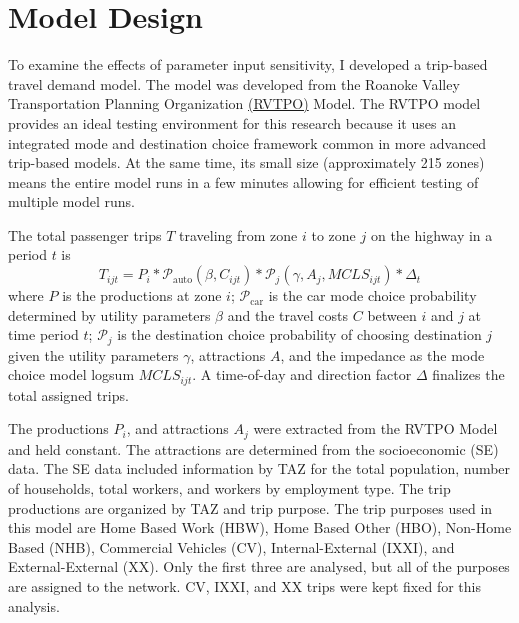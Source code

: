 \documentclass[fancy, masters, twoside]{byuthesis}
\begin{document}
\hypertarget{model-design}{%
\section{Model Design}\label{model-design}}

To examine the effects of parameter input sensitivity, I developed a trip-based travel demand model. The model was developed from the Roanoke Valley Transportation Planning Organization \href{https://github.com/xinwangvdot/rvtpo}{(RVTPO)} Model. The RVTPO model provides an ideal testing environment for this research because it uses an integrated mode and destination choice framework common in more advanced trip-based models. At the same time, its small size (approximately 215 zones) means the entire model runs in a few minutes allowing for efficient testing of multiple model runs.

The total passenger trips \(T\) traveling from zone \(i\) to zone \(j\) on the highway in a period \(t\) is
\begin{equation}
T_{ijt} = P_i * \mathcal{P}_{\mathrm{auto}}(\beta, C_{ijt}) * \mathcal{P}_j(\gamma, A_j, MCLS_{ijt}) * \Delta_t
\label{eq:trips}
\end{equation}
where \(P\) is the productions at zone \(i\); \(\mathcal{P}_{\mathrm{car}}\) is the car mode choice probability determined by utility parameters \(\beta\) and the travel costs \(C\) between \(i\) and \(j\) at time period \(t\); \(\mathcal{P}_{j}\) is the destination choice probability of choosing destination \(j\) given the utility parameters \(\gamma\), attractions \(A\), and the impedance as the mode choice model logsum \(MCLS_{ijt}\). A time-of-day and direction factor \(\Delta\) finalizes the total assigned trips.

The productions \(P_i\), and attractions \(A_j\) were extracted from the RVTPO Model and held constant. The attractions are determined from the socioeconomic (SE) data. The SE data included information by TAZ for the total population, number of households, total workers, and workers by employment type. The trip productions are organized by TAZ and trip purpose. The trip purposes used in this model are Home Based Work (HBW), Home Based Other (HBO), Non-Home Based (NHB), Commercial Vehicles (CV), Internal-External (IXXI), and External-External (XX). Only the first three are analysed, but all of the purposes are assigned to the network. CV, IXXI, and XX trips were kept fixed for this analysis.
\end{document}

